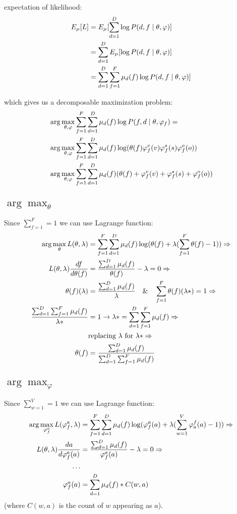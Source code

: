 \documentclass[a4-paper]{article}
\newcommand{\vp}{\ensuremath{\varphi}}
\begin{document}
expectation of likelihood:
\begin{align}
  E_\mu[L] &= E_\mu[\sum_{d=1}^D\log P(d,f\mid\theta,\vp)]\notag\\
  &=\sum_{d=1}^DE_\mu[\log P(d,f\mid\theta,\vp)]\notag\\
  &=\sum_{d=1}^D\sum_{f=1}^F\mu_d(f)\log P(d,f\mid\theta,\vp)]
\end{align}
  

which gives us a decomposable maximization problem:
\begin{align}  
  &\arg\max_{\theta,\vp} \sum_{f=1}^F\sum_{d=1}^D \mu_d(f)\log P(f,d\mid\theta,\vp_f) = \notag\\
  &\arg\max_{\theta,\vp} \sum_{f=1}^F\sum_{d=1}^D \mu_d(f)\log(\theta(f)\vp^v_f(v)\vp^s_f(s)\vp^o_f(o))\notag\\
  &\arg\max_{\theta,\vp} \sum_{f=1}^F\sum_{d=1}^D \mu_d(f)(\theta(f)+\vp^v_f(v)+\vp^s_f(s)+\vp^o_f(o))
\end{align}

\subsection{$\arg\max_\theta$}
Since $\sum_{f=1}^F = 1$ we can use Lagrange function:
\begin{align}
  \arg\max_\theta L(\theta,\lambda) & = \sum_{f=1}^F\sum_{d=1}^D \mu_d(f)\log(\theta(f)+\lambda(\sum_{f=1}^F\theta(f) -1 )) \Rightarrow \notag\\
  L(\theta,\lambda)\frac{df}{d\theta(f)} & = \frac{\sum_{d=1}^D\mu_d(f)}{\theta(f)}-\lambda = 0 \Rightarrow \notag\\
  \theta(f)(\lambda) &= \frac{\sum_{d=1}^D\mu_d(f)}{\lambda}\quad\&\quad \sum_{f=1}^F\theta(f)(\lambda*) = 1 \Rightarrow \notag\\
  \frac{\sum_{d=1}^D\sum_{f=1}^F\mu_d(f)}{\lambda *} &= 1 \rightarrow \lambda *=\sum_{d=1}^D\sum_{f=1}^F\mu_d(f)  \Rightarrow \notag\\
    & \text{replacing } \lambda \text{ for } \lambda* \Rightarrow \notag\\
    \theta(f) &= \frac{\sum_{d=1}^D\mu_d(f)}{\sum_{d=1}^D\sum_{f=1}^F\mu_d(f)} \notag\\
\end{align}

\subsection{$\arg\max_\vp$}
Since $\sum_{w=1}^V = 1$ we can use Lagrange function:
\begin{align}
  \arg\max_{\vp^a_f} L(\vp^a_f,\lambda) & = \sum_{f=1}^F\sum_{d=1}^D \mu_d(f)\log(\vp^a_f(a)+\lambda(\sum_{w=1}^V\vp_a^f(a) -1 )) \Rightarrow \notag\\
  L(\theta,\lambda)\frac{da}{d\vp_f^a(a)} & = \frac{\sum_{d=1}^D\mu_d(f)}{\vp_f^a(a)}-\lambda = 0 \Rightarrow \notag\\
  \dots \notag\\
  \vp_f^a(a) &= \sum^D_{d=1}\mu_d(f)*C(w,a) \notag \\
\end{align}
(where $C(w,a)$ is the count of $w$ appearing as $a$).\\
\end{document}
